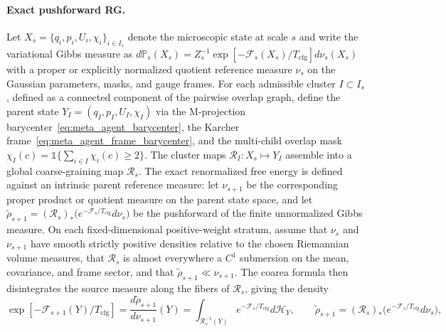 \documentclass[11pt]{article}
\begin{document}
\paragraph{Exact pushforward RG.}
Let $X_s = \{q_i, p_i, U_i, \chi_i\}_{i \in I_s}$ denote the microscopic state at scale $s$ and write the variational Gibbs measure as $d\mathbb{P}_s(X_s) = Z_s^{-1}\exp[-\mathcal{F}_s(X_s)/T_{\mathrm{cfg}}]d\nu_s(X_s)$ with a proper or explicitly normalized quotient reference measure $\nu_s$ on the Gaussian parameters, masks, and gauge frames. For each admissible cluster $I \subset I_s$, defined as a connected component of the pairwise overlap graph, define the parent state $Y_I = (q_I, p_I, U_I, \chi_I)$ via the M-projection barycenter~\eqref{eq:meta_agent_barycenter}, the Karcher frame~\eqref{eq:meta_agent_frame_barycenter}, and the multi-child overlap mask $\chi_I(c) = \mathbb{1}\{\sum_{i \in I}\chi_i(c) \ge 2\}$. The cluster maps $\mathcal{R}_I : X_s \mapsto Y_I$ assemble into a global coarse-graining map $\mathcal{R}_s$. The exact renormalized free energy is defined against an intrinsic parent reference measure: let $\nu_{s+1}$ be the corresponding proper product or quotient measure on the parent state space, and let $\widetilde{\rho}_{s+1} = (\mathcal{R}_s)_*\big(e^{-\mathcal{F}_s/T_{\mathrm{cfg}}}d\nu_s\big)$ be the pushforward of the finite unnormalized Gibbs measure. On each fixed-dimensional positive-weight stratum, assume that $\nu_s$ and $\nu_{s+1}$ have smooth strictly positive densities relative to the chosen Riemannian volume measures, that $\mathcal{R}_s$ is almost everywhere a $C^1$ submersion on the mean, covariance, and frame sector, and that $\widetilde{\rho}_{s+1}\ll\nu_{s+1}$. The coarea formula then disintegrates the source measure along the fibers of $\mathcal{R}_s$, giving the density
\begin{equation}
\exp[-\mathcal{F}_{s+1}(Y)/T_{\mathrm{cfg}}] = \frac{d\widetilde{\rho}_{s+1}}{d\nu_{s+1}}(Y) = \int_{\mathcal{R}_s^{-1}(Y)} e^{-\mathcal{F}_s/T_{\mathrm{cfg}}}d\mathcal{H}_Y, \qquad \widetilde{\rho}_{s+1} = (\mathcal{R}_s)_*\big(e^{-\mathcal{F}_s/T_{\mathrm{cfg}}}d\nu_s\big),
\label{eq:rg_exact_free_energy}
\end{equation}
\end{document}

